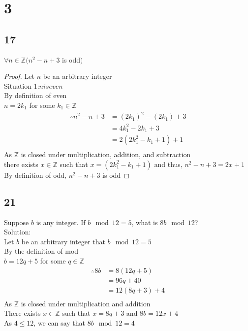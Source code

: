 \documentclass{article}
\begin{document}
\section{3}
\subsection{17}
$\forall n \in \mathbb{Z}(n^2 - n + 3$ is odd$)$
\begin{proof}
Let $n$ be an arbitrary integer\\
Situation 1:$n is even$\\
By definition of even\\
$n = 2k_1$ for some $k_1 \in \mathbb{Z}$\\
\begin{align*}
    \therefore
    n^2 - n +3 &= (2k_1)^2 - (2k_1) + 3 \tag{By Substitution}\\
    &= 4k_1^2 - 2k_1 + 3 \tag{By algebra}\\
    &= 2(2k_1^2 - k_1 + 1) + 1 \tag{By algebra}\\
\end{align*}
As $\mathbb{Z}$ is closed under multiplication, addition, and subtraction\\
there exists $x  \in \mathbb{Z}$ such that $ x = (2k_1^2 - k_1 + 1)$ and thus, $n^2 - n + 3 = 2x + 1$
By definition of odd, $n^2 - n + 3 $ is odd
\end{proof}

\subsection{21}
Suppose $b$ is any integer. If $b \mod 12 = 5$, what is $8b \mod 12$?\\
Solution:\\
Let $b$ be an arbitrary integer that $b \mod 12 = 5$\\
By the definition of mod\\
$b = 12q + 5$ for some $q \in \mathbb{Z}$\\
\begin{align*}
    \therefore
    8b &= 8(12q + 5)\tag{By substitution}\\
    &= 96q + 40\\
    &= 12(8q + 3) + 4 \tag{By algebra}\\
\end{align*}
As $\mathbb{Z}$ is closed under multiplication and addition\\
There exists $x \in \mathbb{Z}$ such that $x = 8q + 3$ and $8b = 12x + 4$\\
As $4 \leq 12$, we can say that $8b \mod 12 = 4$
\end{document}
